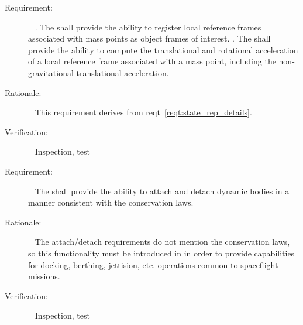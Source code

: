 \label{reqt:vehicle_points}
\begin{description}
\item[Requirement:]\ \newline
  \label{reqt:point_spec}.
    The \ModelDesc shall provide the ability to register local reference frames
    associated with mass points as object frames of interest.
  \label{reqt:point_accel}.
    The \ModelDesc shall provide the ability to compute the translational and
    rotational acceleration of a local reference frame associated with a mass
    point, including the non-gravitational translational acceleration.

\item[Rationale:]\ \newline
  This requirement derives from reqt~\ref{reqt:state_rep_details}.

\item[Verification:]\ \newline
  Inspection, test
\end{description}


\label{reqt:attach_detach}
\begin{description}
\item[Requirement:]\ \newline
  The \ModelDesc shall provide the ability to attach and detach dynamic
  bodies in a manner consistent with the conservation laws.

\item[Rationale:]\ \newline
  The \MASS attach/detach requirements do not mention the
  conservation laws, so this functionality must be introduced in \ModelDesc in order to provide capabilities for docking, berthing, jettision, etc. operations common to spaceflight missions.

\item[Verification:]\ \newline
  Inspection, test
\end{description}
